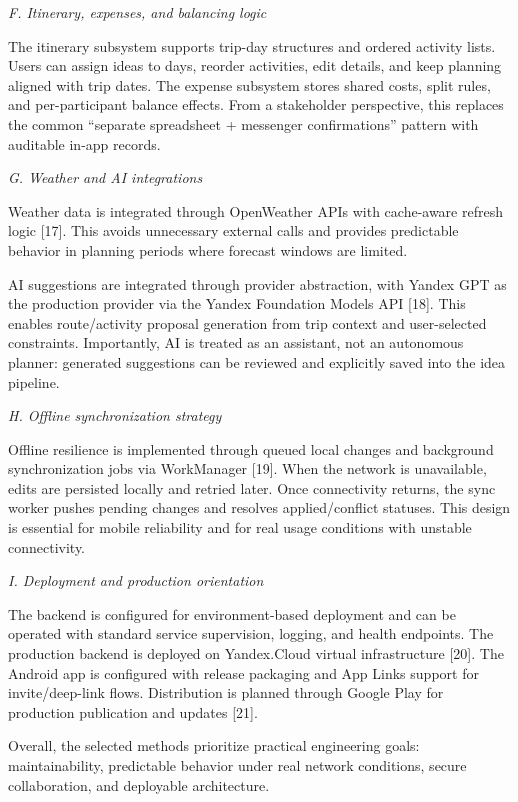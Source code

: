 \documentclass[10pt,twocolumn]{article}
\begin{document}
\textit{F. Itinerary, expenses, and balancing logic}

The itinerary subsystem supports trip-day structures and ordered activity lists. Users can assign ideas to days, reorder activities, edit details, and keep planning aligned with trip dates. The expense subsystem stores shared costs, split rules, and per-participant balance effects. From a stakeholder perspective, this replaces the common ``separate spreadsheet + messenger confirmations'' pattern with auditable in-app records.

\textit{G. Weather and AI integrations}

Weather data is integrated through OpenWeather APIs with cache-aware refresh logic [17]. This avoids unnecessary external calls and provides predictable behavior in planning periods where forecast windows are limited.

AI suggestions are integrated through provider abstraction, with Yandex GPT as the production provider via the Yandex Foundation Models API [18]. This enables route/activity proposal generation from trip context and user-selected constraints. Importantly, AI is treated as an assistant, not an autonomous planner: generated suggestions can be reviewed and explicitly saved into the idea pipeline.

\textit{H. Offline synchronization strategy}

Offline resilience is implemented through queued local changes and background synchronization jobs via WorkManager [19]. When the network is unavailable, edits are persisted locally and retried later. Once connectivity returns, the sync worker pushes pending changes and resolves applied/conflict statuses. This design is essential for mobile reliability and for real usage conditions with unstable connectivity.

\textit{I. Deployment and production orientation}

The backend is configured for environment-based deployment and can be operated with standard service supervision, logging, and health endpoints. The production backend is deployed on Yandex.Cloud virtual infrastructure [20]. The Android app is configured with release packaging and App Links support for invite/deep-link flows. Distribution is planned through Google Play for production publication and updates [21].

Overall, the selected methods prioritize practical engineering goals: maintainability, predictable behavior under real network conditions, secure collaboration, and deployable architecture.
\end{document}
